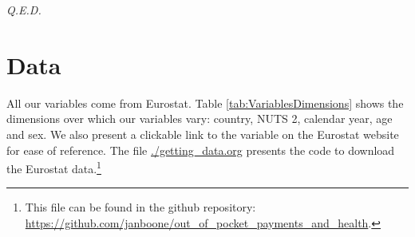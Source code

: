 \documentclass[a4paper,12pt]{article}
\newcommand{\qed}{\hspace*{\fill} {\em Q.E.D.}}
\begin{document}
 \qed







\section{Data}
\label{sec:org1b0600a}

All our variables come from Eurostat. Table \ref{tab:VariablesDimensions} shows the dimensions over which our variables vary: country, NUTS 2, calendar year, age and sex. We also present a clickable link to the variable on the Eurostat website for ease of reference. The file \url{./getting\_data.org} presents the code to download the Eurostat data.\footnote{This file can be found in the github repository: \url{https://github.com/janboone/out\_of\_pocket\_payments\_and\_health}.}
\end{document}
